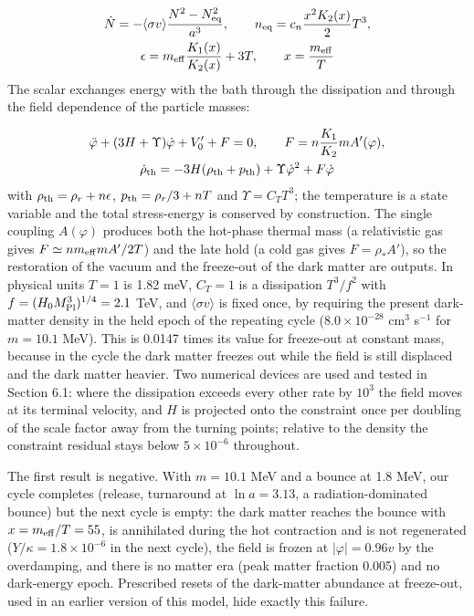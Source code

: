 \documentclass[11pt,a4paper]{article}
\begin{document}
\begin{equation}\begin{gathered}
\dot N=-\langle\sigma v\rangle\frac{N^2-N_{\rm eq}^2}{a^3},\qquad n_{\rm eq}=c_n\frac{x^2K_2(x)}{2}T^3,\\
\epsilon=m_{\rm eff}\frac{K_1(x)}{K_2(x)}+3T,\qquad x=\frac{m_{\rm eff}}{T}
\end{gathered}\end{equation}
The scalar exchanges energy with the bath through the dissipation and through the field dependence of the particle masses:

\begin{equation}\begin{gathered}
\ddot\varphi+(3H+\Upsilon)\dot\varphi+V_0'+F=0,\qquad F=n\frac{K_1}{K_2}mA'(\varphi),\\
\dot\rho_{\rm th}=-3H(\rho_{\rm th}+p_{\rm th})+\Upsilon\dot\varphi^2+F\dot\varphi
\end{gathered}\end{equation}
with $\rho_{\rm th}=\rho_r+n\epsilon$, $p_{\rm th}=\rho_r/3+nT$ and $\Upsilon=C_TT^3$; the temperature is a state variable and the total stress-energy is conserved by construction. The single coupling $A(\varphi)$ produces both the hot-phase thermal mass (a relativistic gas gives $F\simeq nm_{\rm eff}mA'/2T$) and the late hold (a cold gas gives $F=\rho_*A'$), so the restoration of the vacuum and the freeze-out of the dark matter are outputs. In physical units $T=1$ is 1.82 meV, $C_T=1$ is a dissipation $T^3/f^2$ with $f=(H_0M_{\rm Pl}^3)^{1/4}=2.1$ TeV, and $\langle\sigma v\rangle$ is fixed once, by requiring the present dark-matter density in the held epoch of the repeating cycle ($8.0\times10^{-28}$ cm$^3$ s$^{-1}$ for $m=10.1$ MeV). This is 0.0147 times its value for freeze-out at constant mass, because in the cycle the dark matter freezes out while the field is still displaced and the dark matter heavier. Two numerical devices are used and tested in Section 6.1: where the dissipation exceeds every other rate by $10^3$ the field moves at its terminal velocity, and $H$ is projected onto the constraint once per doubling of the scale factor away from the turning points; relative to the density the constraint residual stays below $5\times10^{-6}$ throughout.

The first result is negative. With $m=10.1$ MeV and a bounce at 1.8 MeV, our cycle completes (release, turnaround at $\ln a=3.13$, a radiation-dominated bounce) but the next cycle is empty: the dark matter reaches the bounce with $x=m_{\rm eff}/T=55$, is annihilated during the hot contraction and is not regenerated ($Y/\kappa=1.8\times10^{-6}$ in the next cycle), the field is frozen at $|\varphi|=0.96v$ by the overdamping, and there is no matter era (peak matter fraction 0.005) and no dark-energy epoch. Prescribed resets of the dark-matter abundance at freeze-out, used in an earlier version of this model, hide exactly this failure.
\end{document}
